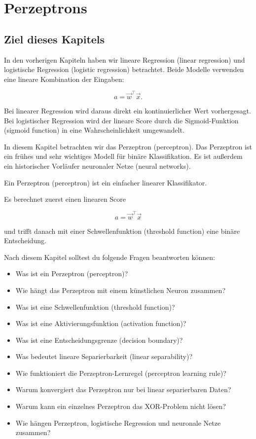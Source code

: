 \chapter{Perzeptrons}

\section{Ziel dieses Kapitels}

In den vorherigen Kapiteln haben wir lineare Regression (linear regression) und logistische Regression (logistic regression) betrachtet.
Beide Modelle verwenden eine lineare Kombination der Eingaben:

\[
    a
    =
    \vec{w}^{\top}\vec{x}.
\]

Bei linearer Regression wird daraus direkt ein kontinuierlicher Wert vorhergesagt.
Bei logistischer Regression wird der lineare Score durch die Sigmoid-Funktion (sigmoid function) in eine Wahrscheinlichkeit umgewandelt.

In diesem Kapitel betrachten wir das Perzeptron (perceptron).
Das Perzeptron ist ein frühes und sehr wichtiges Modell für binäre Klassifikation.
Es ist außerdem ein historischer Vorläufer neuronaler Netze (neural networks).

\begin{conceptbox}
Ein Perzeptron (perceptron) ist ein einfacher linearer Klassifikator.

Es berechnet zuerst einen linearen Score

\[
    a
    =
    \vec{w}^{\top}\vec{x}
\]

und trifft danach mit einer Schwellenfunktion (threshold function) eine binäre Entscheidung.
\end{conceptbox}

Nach diesem Kapitel solltest du folgende Fragen beantworten können:

\begin{itemize}
    \item Was ist ein Perzeptron (perceptron)?
    \item Wie hängt das Perzeptron mit einem künstlichen Neuron zusammen?
    \item Was ist eine Schwellenfunktion (threshold function)?
    \item Was ist eine Aktivierungsfunktion (activation function)?
    \item Was ist eine Entscheidungsgrenze (decision boundary)?
    \item Was bedeutet lineare Separierbarkeit (linear separability)?
    \item Wie funktioniert die Perzeptron-Lernregel (perceptron learning rule)?
    \item Warum konvergiert das Perzeptron nur bei linear separierbaren Daten?
    \item Warum kann ein einzelnes Perzeptron das XOR-Problem nicht lösen?
    \item Wie hängen Perzeptron, logistische Regression und neuronale Netze zusammen?
\end{itemize}

